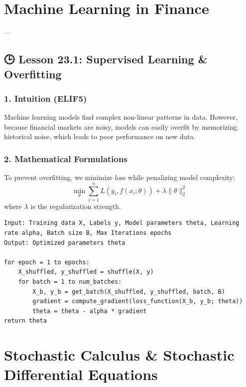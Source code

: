 \documentclass[11pt,oneside]{book}
\begin{document}
\newpage

\chapter{Machine Learning in Finance}

---

\section{🕒 Lesson 23.1: Supervised Learning \& Overfitting}

\subsection{1. Intuition (ELIF5)}
Machine learning models find complex non-linear patterns in data. However, because financial markets are noisy, models can easily overfit by memorizing historical noise, which leads to poor performance on new data.

\subsection{2. Mathematical Formulations}
To prevent overfitting, we minimize loss while penalizing model complexity:
$$\min_{\theta} \sum_{i=1}^n L(y_i, f(x_i; \theta)) + \lambda \|\theta\|_2^2$$
where $\lambda$ is the regularization strength.

\begin{tcolorbox}[colback=white,colframe=black,boxrule=0.6pt,arc=0mm,title=Mini-batch SGD for Financial Models]
\begin{verbatim}
Input: Training data X, Labels y, Model parameters theta, Learning rate alpha, Batch size B, Max Iterations epochs
Output: Optimized parameters theta

for epoch = 1 to epochs:
    X_shuffled, y_shuffled = shuffle(X, y)
    for batch = 1 to num_batches:
        X_b, y_b = get_batch(X_shuffled, y_shuffled, batch, B)
        gradient = compute_gradient(loss_function(X_b, y_b; theta))
        theta = theta - alpha * gradient
return theta
\end{verbatim}
\end{tcolorbox}


\newpage

\chapter{Stochastic Calculus & Stochastic Differential Equations}
\end{document}
